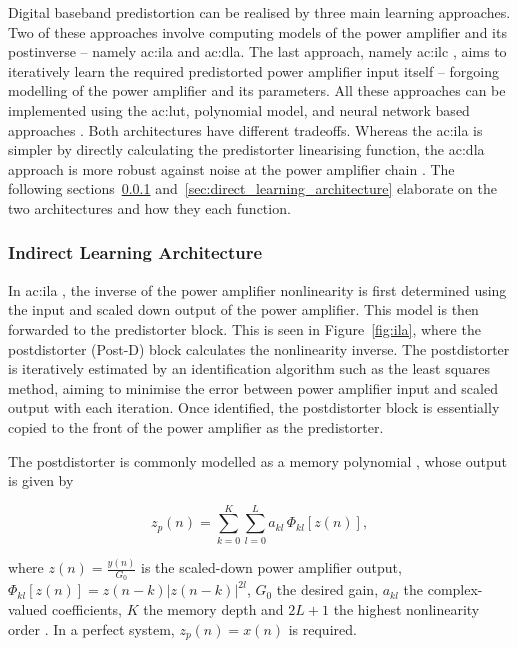 Digital baseband predistortion can be realised by three main learning approaches. Two of these approaches involve computing models of the power amplifier and its postinverse \cite{abihussein2012, morgan2003} -- namely \gls{ac:ila} and \gls{ac:dla}. The last approach, namely \gls{ac:ilc} \cite{chanicahuana}, aims to iteratively learn the required predistorted power amplifier input itself -- forgoing modelling of the power amplifier and its parameters. All these approaches can be implemented using the \gls{ac:lut}, polynomial model, and neural network based approaches \cite{durukal}. Both architectures have different tradeoffs. Whereas the \gls{ac:ila} is simpler by directly calculating the predistorter linearising function, the \gls{ac:dla} approach is more robust against noise at the power amplifier chain \cite{abihussein2012}. The following sections~\ref{sec:indirect_learning_architecture} and~\ref{sec:direct_learning_architecture} elaborate on the two architectures and how they each function.

\subsubsection{Indirect Learning Architecture}\label{sec:indirect_learning_architecture}

In \gls{ac:ila} \cite{ding2004}, the inverse of the power amplifier nonlinearity is first determined using the input and scaled down output of the power amplifier. This model is then forwarded to the predistorter block. This is seen in Figure~\ref{fig:ila}, where the postdistorter (Post-D) block calculates the nonlinearity inverse. The postdistorter is iteratively estimated by an identification algorithm such as the least squares method, aiming to minimise the error between power amplifier input and scaled output with each iteration. Once identified, the postdistorter block is essentially copied to the front of the power amplifier as the predistorter.

The postdistorter is commonly modelled as a memory polynomial \cite{ding2004}, whose output is given by

\begin{equation}
  z_p(n) = \sum_{k=0}^{K}\sum_{l=0}^{L} a_{kl}\,\Phi_{kl}\!\left[z(n)\right],
  \label{eq:ila_postdistorter}
\end{equation}

where $z(n) = \frac{y(n)}{G_0}$ is the scaled-down power amplifier output, $\Phi_{kl}[z(n)] = z(n-k)|z(n-k)|^{2l}$, $G_0$ the desired gain, $a_{kl}$ the complex-valued coefficients, $K$ the memory depth and $2L+1$ the highest nonlinearity order \cite{feng2016}. In a perfect system, $z_p(n) = x(n)$ is required.

